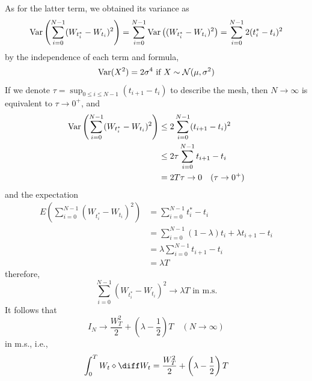     As for the latter term, we obtained its variance as
    \[\mathrm{Var}\left(\sum_{i=0}^{N-1}(W_{t_i^*}-W_{t_i})^2\right)
    =\sum_{i=0}^{N-1}\mathrm{Var}\left((W_{t_i^*}-W_{t_i})^2\right)
    =\sum_{i=0}^{N-1}2(t_i^*-t_i)^2\]
    by the independence of each term and formula,
    \[\mathrm{Var}(X^2)=2\sigma^4\text{ if }X\sim\mathcal N(\mu,\sigma^2)\]
    If we denote $\tau=\sup_{0\leq i\leq N-1}(t_{i+1}-t_i)$ to describe
    the mesh, then $N\to\infty$ is equivalent to $\tau\to 0^+$, and
    \[\begin{aligned}
        \mathrm{Var}\left(\sum_{i=0}^{N-1}(W_{t_i^*}-W_{t_i})^2\right)
    &\leq 2\sum_{i=0}^{N-1}(t_{i+1}-t_i)^2\\
    &\leq 2\tau\sum_{i=0}^{N-1}t_{i+1}-t_i\\
    &=2T\tau\to 0\quad(\tau\to 0^+)
    \end{aligned}\]
    and the expectation
    \[\begin{aligned}
        E\left(\sum_{i=0}^{N-1}(W_{t_i^*}-W_{t_i})^2\right)
        &=\sum_{i=0}^{N-1}t_i^*-t_i\\
        &=\sum_{i=0}^{N-1}(1-\lambda)t_i+\lambda t_{i+1}-t_i\\
        &=\lambda\sum_{i=0}^{N-1}t_{i+1}-t_{i}\\
        &=\lambda T
    \end{aligned}\]
    therefore,
    \[\sum_{i=0}^{N-1}(W_{t_i^*}-W_{t_i})^2\to\lambda T
    \text{ in m.s.}\]
    It follows that
    \[I_N\to \frac{W_T^2}{2}+\left(\lambda-\frac{1}{2}\right)T
    \quad(N\to\infty)\]
    in m.s., i.e.,
    \[\int_0^TW_t\diamond\diff W_t=
    \frac{W_T^2}{2}+\left(\lambda-\frac{1}{2}\right)T\]

